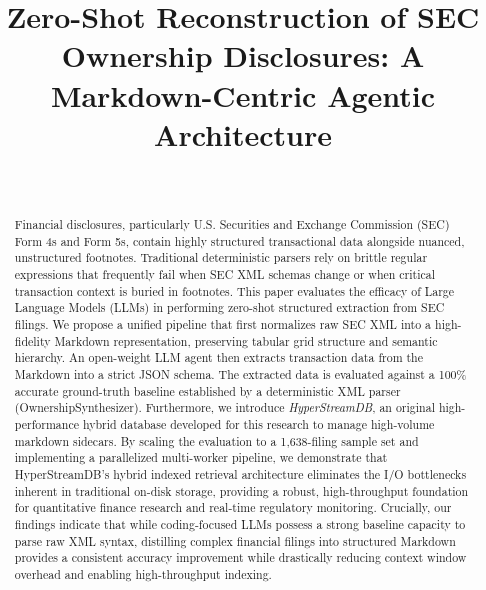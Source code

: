 \documentclass[journal, onecolumn]{IEEEtran}
\begin{document}
\title{Zero-Shot Reconstruction of SEC Ownership Disclosures: A Markdown-Centric Agentic Architecture}

\author{
    \\
}

\maketitle

\begin{abstract}
Financial disclosures, particularly U.S. Securities and Exchange Commission (SEC) Form 4s and Form 5s, contain highly structured transactional data alongside nuanced, unstructured footnotes. Traditional deterministic parsers rely on brittle regular expressions that frequently fail when SEC XML schemas change or when critical transaction context is buried in footnotes. This paper evaluates the efficacy of Large Language Models (LLMs) in performing zero-shot structured extraction from SEC filings. We propose a unified pipeline that first normalizes raw SEC XML into a high-fidelity Markdown representation, preserving tabular grid structure and semantic hierarchy. An open-weight LLM agent then extracts transaction data from the Markdown into a strict JSON schema. The extracted data is evaluated against a 100\% accurate ground-truth baseline established by a deterministic XML parser (OwnershipSynthesizer). Furthermore, we introduce \textit{HyperStreamDB}, an original high-performance hybrid database developed for this research to manage high-volume markdown sidecars. By scaling the evaluation to a 1,638-filing sample set and implementing a parallelized multi-worker pipeline, we demonstrate that HyperStreamDB's hybrid indexed retrieval architecture eliminates the I/O bottlenecks inherent in traditional on-disk storage, providing a robust, high-throughput foundation for quantitative finance research and real-time regulatory monitoring. Crucially, our findings indicate that while coding-focused LLMs possess a strong baseline capacity to parse raw XML syntax, distilling complex financial filings into structured Markdown provides a consistent accuracy improvement while drastically reducing context window overhead and enabling high-throughput indexing.
\end{abstract}
\end{document}
